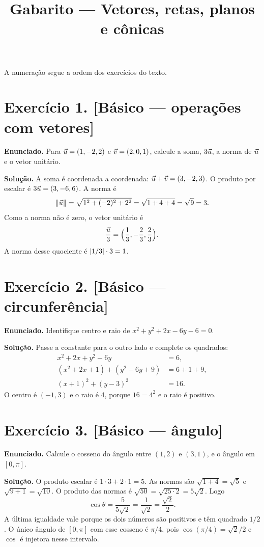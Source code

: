 \documentclass[11pt,a4paper]{article}
\title{Gabarito --- Vetores, retas, planos e cônicas}
\author{}
\date{}
\begin{document}
\maketitle
\tableofcontents

A numeração segue a ordem dos exercícios do texto.

\section*{Exercício 1. [Básico --- operações com vetores]}

\textbf{Enunciado.} Para $\vec{u}=(1,-2,2)$ e $\vec{v}=(2,0,1)$, calcule a soma, $3\vec{u}$, a norma de $\vec{u}$ e o vetor unitário.

\textbf{Solução.}
A soma é coordenada a coordenada: $\vec{u}+\vec{v}=(3,-2,3)$. O produto por escalar é $3\vec{u}=(3,-6,6)$. A norma é
\[
\left\lVert \vec{u} \right\rVert=\sqrt{1^2+(-2)^2+2^2}=\sqrt{1+4+4}=\sqrt{9}=3.
\]
Como a norma não é zero, o vetor unitário é
\[
\frac{\vec{u}}{3}=\Bigl(\frac13,-\frac23,\frac23\Bigr).
\]
A norma desse quociente é $\left\lvert 1/3 \right\rvert\cdot 3=1$.

\section*{Exercício 2. [Básico --- circunferência]}

\textbf{Enunciado.} Identifique centro e raio de $x^2+y^2+2x-6y-6=0$.

\textbf{Solução.}
Passe a constante para o outro lado e complete os quadrados:
\begin{align*}
x^2+2x+y^2-6y&=6,\\
(x^2+2x+1)+(y^2-6y+9)&=6+1+9,\\
(x+1)^2+(y-3)^2&=16.
\end{align*}
O centro é $(-1,3)$ e o raio é $4$, porque $16=4^2$ e o raio é positivo.

\section*{Exercício 3. [Básico --- ângulo]}

\textbf{Enunciado.} Calcule o cosseno do ângulo entre $(1,2)$ e $(3,1)$, e o ângulo em $[0,\pi]$.

\textbf{Solução.}
O produto escalar é $1\cdot 3+2\cdot 1=5$. As normas são $\sqrt{1+4}=\sqrt{5}$ e $\sqrt{9+1}=\sqrt{10}$. O produto das normas é $\sqrt{50}=\sqrt{25\cdot 2}=5\sqrt{2}$. Logo
\[
\cos\theta=\frac{5}{5\sqrt{2}}=\frac{1}{\sqrt{2}}=\frac{\sqrt{2}}{2}.
\]
A última igualdade vale porque os dois números são positivos e têm quadrado $1/2$. O único ângulo de $[0,\pi]$ com esse cosseno é $\pi/4$, pois $\cos(\pi/4)=\sqrt{2}/2$ e $\cos$ é injetora nesse intervalo.
\end{document}
